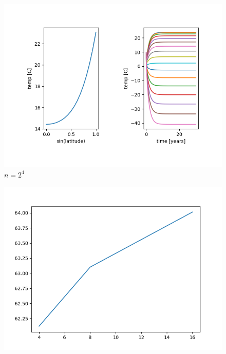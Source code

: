 \documentclass{article}
\theoremstyle{remark}
\begin{document}
\begin{figure}
\centering
\includegraphics{n2e4.png}
\caption{$n = 2^4$}
\end{figure}


\begin{figure}
\centering
\includegraphics{nvserror.png}
\end{figure}





\end{document}

